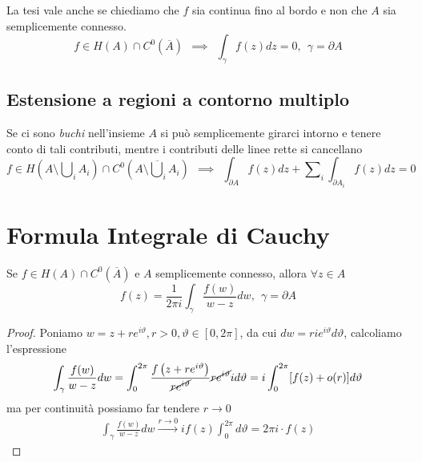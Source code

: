 La tesi vale anche se chiediamo che $f$ sia continua fino al bordo e non che $A$ sia semplicemente connesso.
\begin{equation*}
f\in H(A) \cap C^{0}(\overline{A}) \ \ \implies \ \ \int_{\gamma} f(z) dz = 0, \ \ \gamma = \partial A
\end{equation*}

\subsection{Estensione a regioni a contorno multiplo}

Se ci sono \textit{buchi} nell'insieme $A$ si può semplicemente girarci intorno e tenere conto di tali contributi, mentre i contributi delle linee rette si cancellano
\begin{equation*}
f\in H\left(A\setminus \bigcup\nolimits_{i} A_{i}\right) \cap C^{0}\left(\overline{A\setminus \bigcup\nolimits_{i} A_{i}}\right) \ \ \implies \ \ \int_{\partial A} f(z) dz + \sum\nolimits_{i}\int_{\partial A_{i}} f(z) dz = 0
\end{equation*}

\section{Formula Integrale di Cauchy}

\begin{thm}
Se $f\in H(A) \cap C^{0}(\overline{A})$ e $A$ semplicemente connesso, allora $\forall z\in A$
\begin{equation*}
\boxed{f(z) = \frac{1}{2\pi i}\int_{\gamma}\frac{f(w)}{w - z} dw, \ \ \gamma = \partial A}
\end{equation*}
\end{thm}
\begin{proof}

Poniamo $w = z + re^{i\vartheta}, r > 0, \vartheta \in [0, 2\pi]$, da cui $dw = rie^{i\vartheta} d\vartheta $, calcoliamo l'espressione
\begin{equation*}
\int_{\gamma}\frac{f(w)}{w - z} dw = \int^{2\pi}_{0}\frac{f\left(z + re^{i\vartheta}\right)}{\cancel{re^{i\vartheta}}}\cancel{re^{i\vartheta}} id\vartheta = i\int^{2\pi}_{0}[f(z) + o(r)] d\vartheta
\end{equation*}
ma per continuità possiamo far tendere $r\rightarrow 0$
\begin{gather*}
\int_{\gamma}\frac{f(w)}{w - z} dw\xrightarrow{r\rightarrow 0} if(z)\int^{2\pi}_{0} d\vartheta = 2\pi i\cdot f(z)
\end{gather*}
\end{proof}


